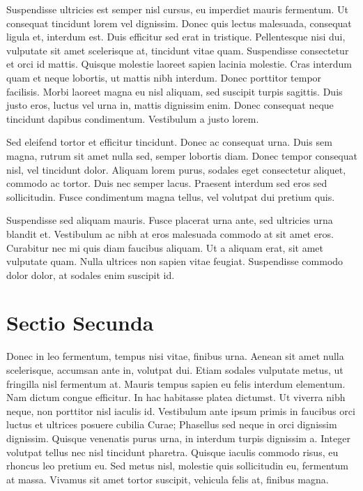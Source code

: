 Suspendisse ultricies est semper nisl cursus, eu imperdiet mauris fermentum. Ut consequat tincidunt lorem vel dignissim. Donec quis lectus malesuada, consequat ligula et, interdum est. Duis efficitur sed erat in tristique. Pellentesque nisi dui, vulputate sit amet scelerisque at, tincidunt vitae quam. Suspendisse consectetur et orci id mattis. Quisque molestie laoreet sapien lacinia molestie. Cras interdum quam et neque lobortis, ut mattis nibh interdum. Donec porttitor tempor facilisis. Morbi laoreet magna eu nisl aliquam, sed suscipit turpis sagittis. Duis justo eros, luctus vel urna in, mattis dignissim enim. Donec consequat neque tincidunt dapibus condimentum. Vestibulum a justo lorem.

Sed eleifend tortor et efficitur tincidunt. Donec ac consequat urna. Duis sem magna, rutrum sit amet nulla sed, semper lobortis diam. Donec tempor consequat nisl, vel tincidunt dolor. Aliquam lorem purus, sodales eget consectetur aliquet, commodo ac tortor. Duis nec semper lacus. Praesent interdum sed eros sed sollicitudin. Fusce condimentum magna tellus, vel volutpat dui pretium quis.

Suspendisse sed aliquam mauris. Fusce placerat urna ante, sed ultricies urna blandit et. Vestibulum ac nibh at eros malesuada commodo at sit amet eros. Curabitur nec mi quis diam faucibus aliquam. Ut a aliquam erat, sit amet vulputate quam. Nulla ultrices non sapien vitae feugiat. Suspendisse commodo dolor dolor, at sodales enim suscipit id.


\section{Sectio Secunda}
Donec in leo fermentum, tempus nisi vitae, finibus urna. Aenean sit amet nulla scelerisque, accumsan ante in, volutpat dui. Etiam sodales vulputate metus, ut fringilla nisl fermentum at. Mauris tempus sapien eu felis interdum elementum. Nam dictum congue efficitur. In hac habitasse platea dictumst. Ut viverra nibh neque, non porttitor nisl iaculis id. Vestibulum ante ipsum primis in faucibus orci luctus et ultrices posuere cubilia Curae; Phasellus sed neque in orci dignissim dignissim. Quisque venenatis purus urna, in interdum turpis dignissim a. Integer volutpat tellus nec nisl tincidunt pharetra. Quisque iaculis commodo risus, eu rhoncus leo pretium eu. Sed metus nisl, molestie quis sollicitudin eu, fermentum at massa. Vivamus sit amet tortor suscipit, vehicula felis at, finibus magna.

